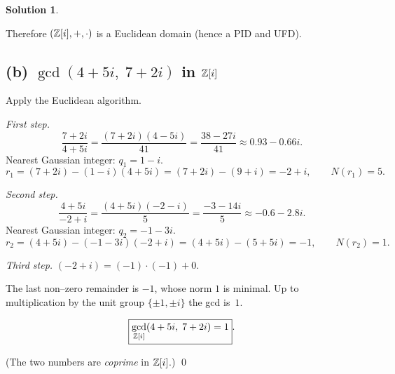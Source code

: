 \documentclass[12pt]{article}
\theoremstyle{definition} %
\newtheorem{solution}{Solution}
\theoremstyle{plain} %
\begin{document}
\begin{solution}
\begin{enumerate}[label=\textit{Step \arabic*:},wide, labelwidth=0pt,labelsep=.8em]
                      \end{enumerate}
                      Therefore $(\Bbb Z[i],+,\cdot)$ is a Euclidean domain (hence a PID and UFD).
                      
                      \subsection*{(b)  $\gcd(4+5i,\;7+2i)$ in $\Bbb Z[i]$}
                      
                      Apply the Euclidean algorithm.
                      
                      \medskip\noindent
                      \textit{First step.}
                      \[
                         \frac{7+2i}{4+5i}
                         =\frac{(7+2i)(4-5i)}{41}
                         =\frac{38-27i}{41}
                         \approx 0.93-0.66i.
                      \]
                      Nearest Gaussian integer: $q_{1}=1-i$.
                      \[
                         r_{1}=(7+2i)-(1-i)(4+5i)=(7+2i)-(9+i)=-2+i,\qquad N(r_{1})=5.
                      \]
                      
                      \medskip\noindent
                      \textit{Second step.}
                      \[
                         \frac{4+5i}{-2+i}
                         =\frac{(4+5i)(-2-i)}{5}
                         =\frac{-3-14i}{5}
                         \approx-0.6-2.8i.
                      \]
                      Nearest Gaussian integer: $q_{2}=-1-3i$.
                      \[
                         r_{2}=(4+5i)-(-1-3i)(-2+i)=(4+5i)-(5+5i)=-1,\qquad N(r_{2})=1.
                      \]
                      
                      \medskip\noindent
                      \textit{Third step.}\;
                      $(-2+i)=(-1) \cdot (-1) + 0$.
                      
                      The last non–zero remainder is $-1$, whose norm $1$ is minimal.
                      Up to multiplication by the unit group $\{\pm1,\pm i\}$ the gcd is~$1$.
                      
                      \[
                            \boxed{\gcd_{\Bbb Z[i]}(4+5i,\;7+2i)=1}.
                      \]
                      
                      \noindent(The two numbers are \emph{coprime} in $\Bbb Z[i]$.)
                      \qed
                      \end{solution}
\end{document}
